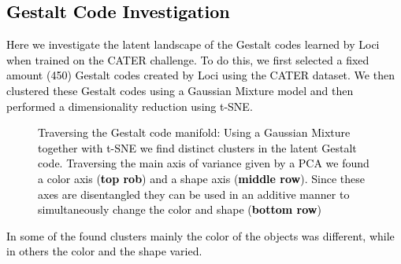 \documentclass{article} \usepackage{iclr2023_conference_arxiv,times}
\def\imagepaddingtiny{0.1cm}
\def\imagepaddingtinyy{0.05cm}
\newcommand{\changed}{\textcolor{black}}
\begin{document}
\subsection{\changed{Gestalt Code Investigation}}
\changed{
Here we investigate the latent landscape of the Gestalt codes learned by Loci when trained on the CATER challenge. To do this, we first selected a fixed amount (450) Gestalt codes created by Loci using the CATER dataset. We then clustered these Gestalt codes using a Gaussian Mixture model and then performed a dimensionality reduction using t-SNE. 
}
\begin{figure*}[t!]
    \begin{elasticrow}[\imagepaddingtiny]
    \end{elasticrow}
    \vskip\imagepaddingtinyy
    \begin{elasticrow}[\imagepaddingtiny]
    \end{elasticrow}
    \vskip\imagepaddingtinyy
    \begin{elasticrow}[\imagepaddingtiny]
    \end{elasticrow}
    \vskip\imagepaddingtinyy
    \caption{\changed{Traversing the Gestalt code manifold: Using a Gaussian Mixture together with t-SNE we find distinct clusters in the latent Gestalt code. Traversing the main axis of variance given by a PCA we found a color axis (\textbf{top rob}) and a shape axis (\textbf{middle row}).  Since these axes are disentangled they can be used in an additive manner to simultaneously change the color and shape (\textbf{bottom row})}}
    \label{fig:cluster_analysis}
\end{figure*}
\changed{
In some of the found clusters mainly the color of the objects was different, while in others the color and the shape varied. 
}
\end{document}

